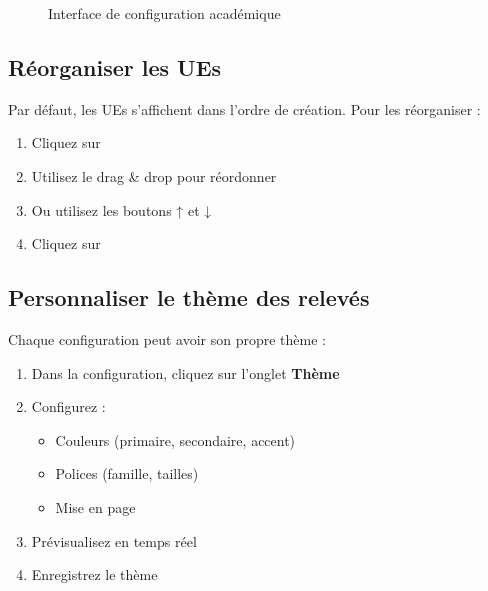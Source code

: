 \begin{figure}[h]
    \centering
    \caption{Interface de configuration académique}
\end{figure}

\subsection{Réorganiser les UEs}

Par défaut, les UEs s'affichent dans l'ordre de création. Pour les réorganiser :

\begin{enumerate}[leftmargin=*]
    \item Cliquez sur 
    \item Utilisez le drag \& drop pour réordonner
    \item Ou utilisez les boutons ↑ et ↓
    \item Cliquez sur 
\end{enumerate}

\subsection{Personnaliser le thème des relevés}

Chaque configuration peut avoir son propre thème :

\begin{enumerate}[leftmargin=*]
    \item Dans la configuration, cliquez sur l'onglet \textbf{Thème}
    \item Configurez :
    \begin{itemize}
        \item Couleurs (primaire, secondaire, accent)
        \item Polices (famille, tailles)
        \item Mise en page
    \end{itemize}
    \item Prévisualisez en temps réel
    \item Enregistrez le thème
\end{enumerate}

